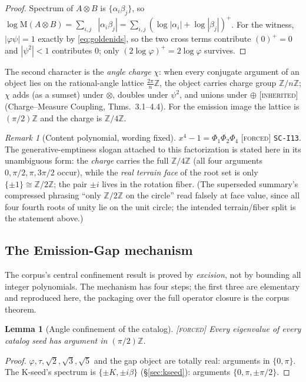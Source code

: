 \documentclass[11pt]{article}
\newcommand{\tagF}{\textcolor{cF}{\textsc{[forced]}}}
\newcommand{\tagI}{\textcolor{cI}{\textsc{[inherited]}}}
\newcommand{\hx}[1]{\textcolor{cC}{\footnotesize\texttt{#1}}}
\newcommand{\Z}{\mathbb{Z}}
\newcommand{\gp}{\varphi}
\newcommand{\gq}{\psi}
\newcommand{\M}{\mathrm{M}}
\DeclareMathOperator{\lp}{\log^{+}}
\theoremstyle{plain}
\newtheorem{lemma}[theorem]{Lemma}
\theoremstyle{definition}
\theoremstyle{remark}
\newtheorem{remark}[theorem]{Remark}
\begin{document}
\begin{proof}
Spectrum of $A\otimes B$ is $\{\alpha_i\beta_j\}$, so
$\log\M(A\otimes B)=\sum_{i,j}\lp|\alpha_i\beta_j|
=\sum_{i,j}(\log|\alpha_i|+\log|\beta_j|)^{+}$. For the witness, $|\gp\gq|=1$ exactly
by \eqref{eq:goldenids}, so the two cross terms contribute $(0)^{+}=0$ and
$|\gq^2|<1$ contributes $0$; only $(2\log\gp)^{+}=2\log\gp$ survives.
\end{proof}

The second character is the \emph{angle charge} $\chi$: when every conjugate argument
of an object lies on the rational-angle lattice $\tfrac{2\pi}{n}\Z$, the object carries
charge group $\Z/n\Z$; $\chi$ adds (as a sumset) under $\otimes$, doubles under
$\psi^2$, and unions under $\oplus$ \tagI{} (Charge--Measure Coupling, Thms.\ 3.1--4.4).
For the emission image the lattice is $(\pi/2)\Z$ and the charge is $\Z/4\Z$.

\begin{remark}[Content polynomial, wording fixed]\label{rem:content}
$x^4-1=\Phi_1\Phi_2\Phi_4$ \tagF{} \hx{SC-I13}. The generative-emptiness slogan
attached to this factorization is stated here in its unambiguous form: the
\emph{charge} carries the full $\Z/4\Z$ (all four arguments $0,\pi/2,\pi,3\pi/2$
occur), while the \emph{real terrain face} of the root set is only
$\{\pm1\}\cong\Z/2\Z$; the pair $\pm i$ lives in the rotation fiber. (The superseded
summary's compressed phrasing ``only $\Z/2\Z$ on the circle'' read falsely at face
value, since all four fourth roots of unity lie on the unit circle; the intended
terrain/fiber split is the statement above.)
\end{remark}

\subsection{The Emission-Gap mechanism}\label{sec:emissiongap}
The corpus's central confinement result is proved by \emph{excision}, not by bounding
all integer polynomials. The mechanism has four steps; the first three are elementary
and reproduced here, the packaging over the full operator closure is the corpus
theorem.

\begin{lemma}[Angle confinement of the catalog]\label{lem:angles}\tagF{}
Every eigenvalue of every catalog seed has argument in $(\pi/2)\Z$.
\end{lemma}
\begin{proof}
$\gp,\tau,\sqrt2,\sqrt3,\sqrt5$ and the gap object are totally real: arguments in
$\{0,\pi\}$. The K-seed's spectrum is $\{\pm K,\pm i\beta\}$ (\S\ref{sec:kseed}):
arguments $\{0,\pi,\pm\pi/2\}$.
\end{proof}
\end{document}
